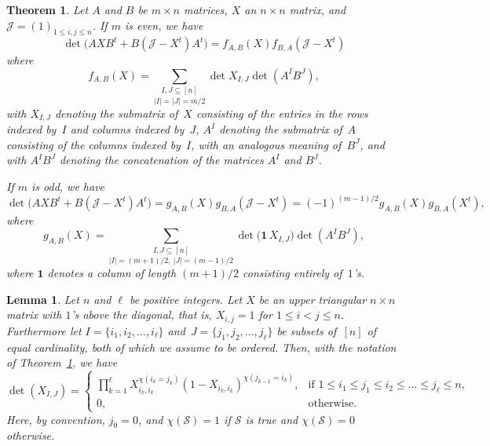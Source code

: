 \documentclass[10pt,a4paper]{amsart}
\newtheorem{theorem}{Theorem}
\newtheorem{lemma}{Lemma}
\def\J{\mathcal J}
\begin{document}
\begin{theorem} \label{thm:main1}
Let $A$ and $B$ be $m\times n$ matrices,
$X$ an $n\times n$ matrix, and
$\J =(1)_{1\le i,j\le n}$. If $m$ is even, we have
\begin{equation} \label{eq:1}
\det\bigl(AXB^t+B(\J -X^t)A^t\bigr)
=f_{A,B}(X)f_{B,A}(\J -X^t)
\end{equation}
where
$$
f_{A,B}(X)=\underset {|I|=|J|=m/2}{\sum_{I,J\subseteq[n]}}
\det X_{I,J} \det(A^IB^J),
$$
with $X_{I,J}$ denoting the submatrix of~$X$ consisting of the entries
in the 
rows indexed by~$I$ and columns indexed by~$J$, $A^I$ denoting
the submatrix of~$A$ consisting of the columns indexed by~$I$,
with an analogous meaning of~$B^J$, and with $A^IB^J$ denoting
the concatenation of the matrices $A^I$ and $B^J$.

If $m$ is odd, we have
\begin{equation} \label{eq:1o}
\det\bigl(AXB^t+B(\J -X^t)A^t\bigr)
=g_{A,B}(X)g_{B,A}(\J -X^t)
=(-1)^{(m-1)/2}g_{A,B}(X)g_{B,A}(X^t),
\end{equation}
where
$$
g_{A,B}(X)=\underset {|I|=(m+1)/2,\ |J|=(m-1)/2}{\sum_{I,J\subseteq[n]}}
\det\bigl(\mathbf1 \, X_{I,J}\bigr) \det(A^IB^J),
$$
where $\mathbf 1$ denotes a column of length $(m+1)/2$ consisting
entirely of~$1$'s.
\end{theorem}

\begin{lemma} \label{lem:X1}
Let $n$ and $\ell$ be positive integers.
Let $X$ be an upper triangular $n\times n$ matrix with $1$'s above
the diagonal, that is, $X_{i,j}=1$ for $1\le i<j\le n$.
Furthermore let $I=\{i_1,i_2,\dots,i_\ell\}$ and~$J=\{j_1,j_2,\dots,j_\ell\}$
be subsets of~$[n]$ of equal cardinality, both of which we assume to
be ordered.
Then, with the notation of Theorem~\ref{thm:main1}, we have
\begin{equation} \label{eq:X1} 
\det(X_{I,J})=\begin{cases}
\prod _{k=1} ^{\ell}X_{i_k,i_k}^{\chi(i_k=j_k)}
(1-X_{i_k,i_k})^{\chi(j_{k-1}=i_k)},&
\text{if }1\le i_1\le j_1\le i_2\le\dots\le j_\ell\le n,\\
0,&\text{otherwise}.
\end{cases}
\end{equation}
Here, by convention, $j_0=0$, and
$\chi(\mathcal S)=1$ if $\mathcal S$ is true and
$\chi(\mathcal S)=0$ otherwise.
\end{lemma} 
\end{document}
